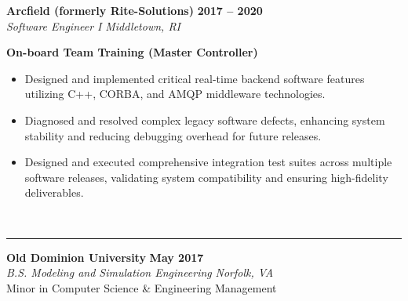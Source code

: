 \documentclass[10pt,letterpaper]{article}
\begin{document}
\vspace{4pt}
\noindent \textbf{Arcfield (formerly Rite-Solutions)} \hfill \textbf{2017 -- 2020} \\
\textit{Software Engineer I} \hfill \textit{Middletown, RI}

\vspace{1pt}
\noindent \textbf{On-board Team Training (Master Controller)}
\begin{itemize}[leftmargin=*, label={$\bullet$}, itemsep=0.5pt, topsep=0pt, parsep=0pt]
    \item Designed and implemented critical real-time backend software features utilizing C++, CORBA, and AMQP middleware technologies.
    \item Diagnosed and resolved complex legacy software defects, enhancing system stability and reducing debugging overhead for future releases.
    \item Designed and executed comprehensive integration test suites across multiple software releases, validating system compatibility and ensuring high-fidelity deliverables.
\end{itemize}

\vspace{4pt}

 \\[-6pt]
\rule{\textwidth}{0.8pt}

\noindent \textbf{Old Dominion University} \hfill \textbf{May 2017} \\
\textit{B.S. Modeling and Simulation Engineering} \hfill \textit{Norfolk, VA} \\
Minor in Computer Science \& Engineering Management
\end{document}
